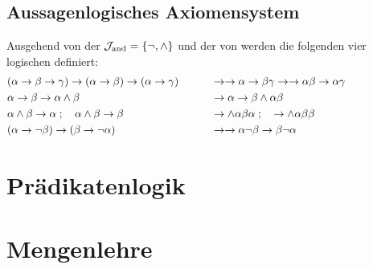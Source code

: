 \subsection{Aussagenlogisches Axiomensystem}%
\label{sub:ausAxiome}

Ausgehend von der  $\mathcal{J}_{\mathrm{and}} = \{\lnot, \land\}$ und der  von \symqt{\limp} werden die folgenden vier logischen  definiert:
\begin{align}
	&
	(\alpha\rightarrow\beta\rightarrow\gamma)\rightarrow(\alpha\rightarrow\beta)\rightarrow(\alpha\rightarrow\gamma)
	&&&& &
	& \rightarrow\rightarrow\alpha\rightarrow\beta\gamma\rightarrow\rightarrow\alpha\beta\rightarrow\alpha\gamma \\
	& \alpha \rightarrow \beta \rightarrow \alpha \land \beta
	&&&& &
	& \rightarrow \alpha \rightarrow \beta \land \alpha \beta \\
	& \alpha \land \beta \rightarrow \alpha \;; \quad \alpha \land \beta \rightarrow \beta
	&&&& &
	& \rightarrow \land \alpha \beta \alpha \;; \quad \rightarrow \land \alpha \beta \beta\\
	&(\alpha \rightarrow \lnot \beta) \rightarrow (\beta \rightarrow \lnot \alpha)
	&&&& &
	& \rightarrow \rightarrow \alpha \lnot \beta \rightarrow \beta \lnot \alpha
	&&&&&&&&&&
\end{align}
%

\section{Prädikatenlogik}%
\label{sec:Prädikatenlogik}


\section{Mengenlehre}%
\label{sec:Mengenlehre}


\endgroup%

\Endchapter
